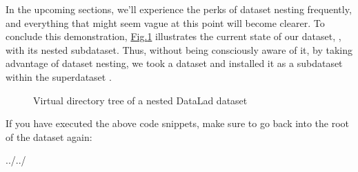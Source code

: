 \sphinxAtStartPar
In the upcoming sections, we’ll experience the perks of dataset nesting
frequently, and everything that might seem vague at this point will become
clearer. To conclude this demonstration,
\hyperref[\detokenize{basics/101-106-nesting:fignesting}]{Fig.\@ \ref{\detokenize{basics/101-106-nesting:fignesting}}} illustrates the current state of our dataset, , with its nested subdataset.
Thus, without being consciously aware of it, by taking advantage of dataset
nesting, we took a dataset  and installed it as a
subdataset within the superdataset  .

\begin{figure}[tbp]
\centering
\capstart

\noindent{}
\caption{Virtual directory tree of a nested DataLad dataset}\label{\detokenize{basics/101-106-nesting:id1}}\label{\detokenize{basics/101-106-nesting:fignesting}}\end{figure}

\sphinxAtStartPar
If you have executed the above code snippets, make sure to go back into the
root of the dataset again:

\begin{sphinxVerbatim}[commandchars=\\\{\}]
../../
\end{sphinxVerbatim}

\sphinxstepscope


